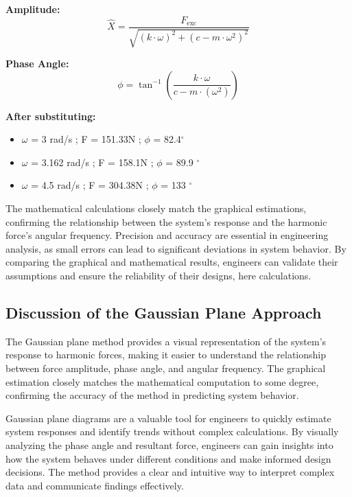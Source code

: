 \documentclass[12pt,a4paper]{article}
\begin{document}
\noindent\textbf{Amplitude:} 
\[
\hat{X} = \frac{F_{\text{exc}}}{\sqrt{(k \cdot \omega)^2 + (c - m \cdot \omega^2)^2}}
\]

\noindent\textbf{Phase Angle:}
\[
\phi = \tan^{-1} \left( \frac{k \cdot \omega}{c - m \cdot (\omega^2)} \right)
\]

\noindent\textbf{After substituting:}
\begin{itemize}
    \item \(\omega\) = 3 rad/s ; F = 151.33N ; \(\phi\) = 82.4\(^{\circ}\)
    \item \(\omega\) = 3.162 rad/s ; F = 158.1N ; \(\phi\) = 89.9 \(^{\circ}\)
    \item \(\omega\) = 4.5 rad/s ; F = 304.38N ; \(\phi\) = 133 \(^{\circ}\)
\end{itemize}
{\vspace{5pt}}
The mathematical calculations closely match the graphical estimations, confirming the relationship between the system's response and the harmonic force's angular frequency. 
Precision and accuracy are essential in engineering analysis, as small errors can lead to significant deviations in system behavior. By comparing the graphical and mathematical results, engineers can validate their assumptions and ensure the reliability of their designs, here calculations.
{\vspace{5pt}}
\subsection{Discussion of the Gaussian Plane Approach}

The Gaussian plane method provides a visual representation of the system's response to harmonic forces, making it easier to understand the relationship between force amplitude, phase angle, and angular frequency. The graphical estimation closely matches the mathematical computation to some degree, confirming the accuracy of the method in predicting system behavior.

\vspace{5pt}

Gaussian plane diagrams are a valuable tool for engineers to quickly estimate system responses and identify trends without complex calculations. By visually analyzing the phase angle and resultant force, engineers can gain insights into how the system behaves under different conditions and make informed design decisions. The method provides a clear and intuitive way to interpret complex data and communicate findings effectively.
\end{document}
